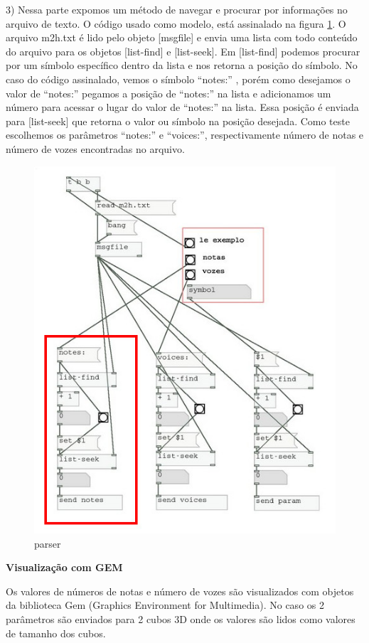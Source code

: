 \documentclass{ppgmus}
\begin{document}
3) Nessa parte expomos um método de navegar e procurar por
informações no arquivo de texto. O código usado como modelo,
está assinalado na figura \ref{parser}. O arquivo m2h.txt
é lido pelo objeto [msgfile] e envia uma lista com todo conteúdo
do arquivo para os objetos [list-find] e [list-seek]. Em [list-find]
podemos procurar por um símbolo específico dentro da lista e nos retorna
a posição do símbolo. No caso do código assinalado, vemos o símbolo 
``notes:'' , porém como desejamos o valor de ``notes:'' pegamos a posição
de ``notes:'' na lista e adicionamos um número para acessar o lugar do valor de
``notes:'' na lista. Essa posição é enviada para [list-seek] que retorna o valor ou
símbolo na posição desejada. Como teste escolhemos os parâmetros ``notes:'' e ``voices:'', 
respectivamente número de notas e número de vozes encontradas no arquivo.


\begin{figure}[-h]
\includegraphics[scale=.5]{parser00}
\caption{parser}
\label{parser}
\end{figure} 


\textbf{Visualização com GEM}


  Os valores de números de notas e número de vozes são visualizados
com objetos da biblioteca Gem (Graphics Environment for Multimedia).
No caso os 2 parâmetros são enviados para 2 cubos 3D onde os valores
são lidos como valores de tamanho dos cubos.
\end{document}
